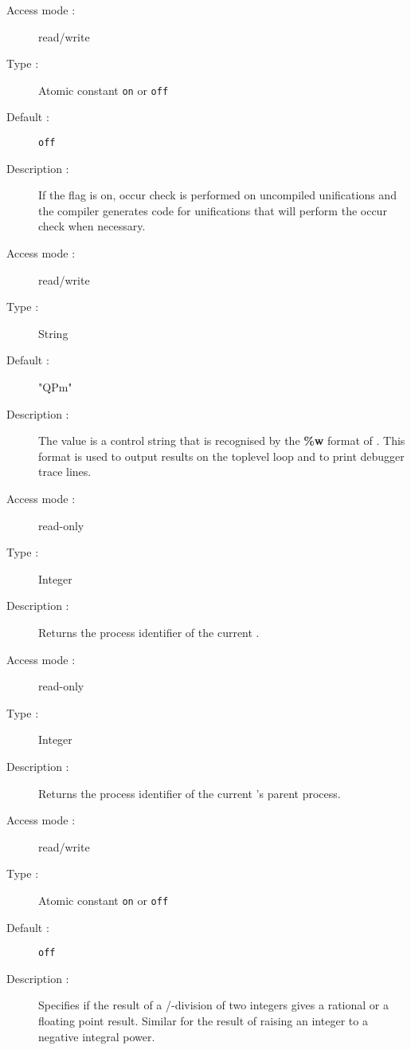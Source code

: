 \begin{description}
\begin{description}
\item[Access mode :] read/write
\item[Type : ] Atomic constant {\tt on} or {\tt off}
\item[Default : ] {\tt off}
\item[Description :] If the flag is on, occur check is performed
on uncompiled unifications and the compiler generates code for unifications
that will perform the occur check when necessary.
\end{description}

\begin{description}
\item[Access mode :] read/write
\item[Type :] String
\item[Default : ] "QPm"
\item[Description :] The value is a control string that is recognised
by the {\bf \%w} format of .
This format is used to output results on the toplevel loop and to print
debugger trace lines.
\end{description}

\begin{description}
\item[Access mode : ] read-only
\item[Type : ] Integer
\item[Description : ] Returns the process identifier of the current {\eclipse}.
\end{description}

\pagebreak[3]
\begin{description}
\item[Access mode : ] read-only
\item[Type : ] Integer
\item[Description : ] Returns the process identifier of the current {\eclipse}'s
parent process.
\end{description}

\begin{description}
\item[Access mode : ] read/write
\item[Type : ] Atomic constant {\tt on} or {\tt off}
\item[Default : ] {\tt off}
\item[Description : ] Specifies if the result of a /-division of two integers
gives a rational or a floating point result.
Similar for the result of raising an integer to a negative integral power.
\end{description}


\end{description}
